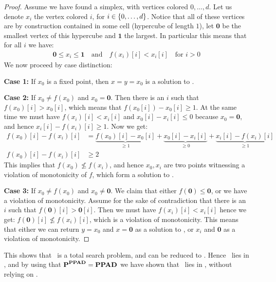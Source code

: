 \begin{proof}
    Assume we have found a simplex, with vertices colored $0, \dots, d$. Let us denote $x_i$ the vertex colored $i$, for $i \in \left\{0, \dots, d\right\}$. Notice that all of these vertices are by construction contained in some cell (hypercube of length $1$), let $\mathbf{0}$ be the smallest vertex of this hypercube and $\mathbf{1}$ the largest. In particular this means that for all $i$ we have:
    \begin{align*}
        \mathbf{0} \leq x_i \leq \mathbf{1} \quad \text{and} \quad f(x_i)[i] < x_i[i] \quad \text{for $i > 0$}
    \end{align*}
    We now proceed by case distinction:

    \textbf{Case 1:} If $x_0$ is a fixed point, then $x = y = x_0$ is a solution to \Tarskistar.

    \textbf{Case 2:} If $x_0 \neq f(x_0)$ and $x_0 = \mathbf{0}$. Then there is an $i$ such that $f(x_0)[i] > x_0[i]$, which means that $f(x_0[i]) - x_0[i] \geq 1$. At the same time we must have $f(x_i)[i] < x_i[i]$ and $x_0[i] - x_i[i] \leq 0$ because $x_0 = \mathbf{0}$, and hence $x_i[i] - f(x_i)[i] \geq 1$. Now we get:
    \begin{align*}
        f(x_0)[i] - f(x_i)[i] & = \underbrace{f(x_0)[i] - x_0[i]}_{\geq 1} + \underbrace{x_0[i] - x_i[i]}_{\geq 0} + \underbrace{x_i[i] - f(x_i)[i]}_{\geq 1} \\
        f(x_0)[i] - f(x_i)[i] & \geq 2
    \end{align*}
    This implies that $f(x_0) \not \leq f(x_i)$, and hence $x_0, x_i$ are two points witnessing a violation of monotonicity of $f$, which form a solution to \Tarskistar.

    \textbf{Case 3:} If $x_0 \neq f(x_0)$ and $x_0 \neq \mathbf{0}$. We claim that either $f(\mathbf{0}) \leq \mathbf{0}$, or we have a violation of monotonicity. Assume for the sake of contradiction that there is an $i$ such that $f(\mathbf{0})[i] > \mathbf{0}[i]$. Then we must have $f(x_i)[i] < x_i[i]$ hence we get: $f(\mathbf{0})[i] \not\leq f(x_i)[i]$, which is a violation of monotonicity. This means that either we can return $y = x_0$ and $x = \mathbf{0}$ as a solution to \Tarskistar, or $x_i$ and $\mathbf{0}$ as a violation of monotonicity.
\end{proof}
This shows that \Tarskistar\ is a total search problem, and can be reduced to \Sperner. Hence \Tarskistar\ lies in \PPAD, and by using that $\textbf{P}^{\textbf{PPAD}} = \textbf{PPAD}$ we have shown that \Tarski\ lies in \PPAD, without relying on \Brouwer.
